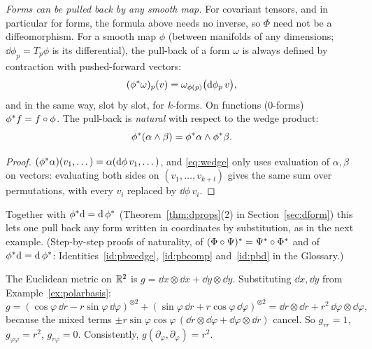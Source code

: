 \emph{Forms can be pulled back by any smooth map.} For covariant tensors, and in particular for forms, the formula above
needs no inverse, so $\Phi$ need not be a diffeomorphism. For a smooth map $\phi$ (between manifolds of any dimensions;
$\dd\phi_p=T_p\phi$ is its differential), the pull-back of a form $\omega$ is always defined by contraction with pushed-forward vectors:
\begin{equation}\label{eq:pullback}
(\phi{}^{*}\omega)_p(v)=\omega_{\phi(p)}\bigl(\mathrm{d}\phi_p\,v\bigr),
\end{equation}
and in the same way, slot by slot, for $k$-forms. On functions ($0$-forms) $\phi{}^{*} f=f\circ\phi$. The pull-back is
\emph{natural} with respect to the wedge product:
\[
\phi{}^{*}(\alpha\wedge\beta)=\phi{}^{*}\alpha\wedge\phi{}^{*}\beta .
\]
\begin{proof}
$(\phi{}^{*}\alpha)(v_1,\dots)=\alpha(\mathrm{d}\phi\,v_1,\dots)$, and \eqref{eq:wedge} only uses evaluation of $\alpha,\beta$ on
vectors: evaluating both sides on $(v_1,\dots,v_{k+l})$ gives the same sum over permutations, with every $v_i$ replaced by $\dd\phi\,v_i$.
\end{proof}
Together with $\phi{}^{*}\mathrm{d}=\mathrm{d}\,\phi{}^{*}$ (Theorem~\ref{thm:dprops}(2) in Section~\ref{sec:dform}) this lets one pull back any form written in coordinates by
substitution, as in the next example. (Step-by-step proofs of naturality, of $(\Phi\circ\Psi){}^{*}=\Psi{}^{*}\circ\Phi{}^{*}$ and of
$\phi{}^{*}\mathrm{d}=\mathrm{d}\,\phi{}^{*}$: Identities~\ref{id:pbwedge}, \ref{id:pbcomp} and~\ref{id:pbd} in the Glossary.)%

\begin{example}\label{ex:polarmetric}
The Euclidean metric on $\mathbb{R}^2$ is $g=\dd x\otimes\dd x+\dd y\otimes\dd y$. Substituting $\dd x,\dd y$ from Example~\ref{ex:polarbasis}:
\[
g=(\cos\varphi\,\dd r-r\sin\varphi\,\dd\varphi)^{\otimes2}+(\sin\varphi\,\dd r+r\cos\varphi\,\dd\varphi)^{\otimes2}
=\dd r\otimes\dd r+r^2\,\dd\varphi\otimes\dd\varphi ,
\]
because the mixed terms $\pm r\sin\varphi\cos\varphi\,(\dd r\otimes\dd\varphi+\dd\varphi\otimes\dd r)$ cancel. So $g_{rr}=1$, $g_{\varphi\varphi}=r^2$, $g_{r\varphi}=0$. Consistently, $g(\partial_\varphi,\partial_\varphi)=r^2$.
\end{example}


